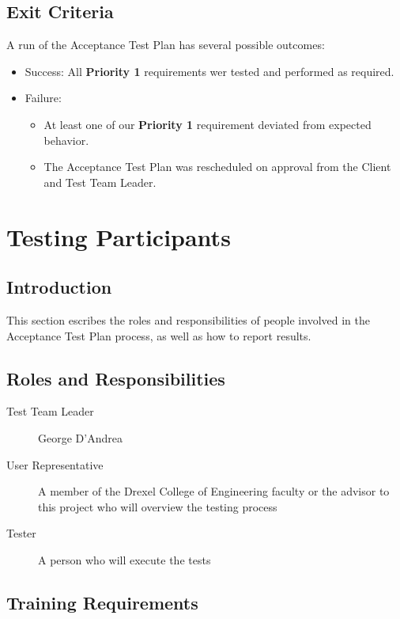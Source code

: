 \documentclass{article}
\begin{document}
\subsection{Exit Criteria}
	A run of the Acceptance Test Plan has several possible outcomes:
	\begin{itemize}
		\item Success: All \textbf{Priority 1} requirements wer tested and 
		performed as required.
		\item Failure:
			\begin{itemize}
				\item At least one of our \textbf{Priority 1} requirement 
				deviated from expected behavior.
				\item The Acceptance Test Plan was rescheduled on approval from 
				the Client and Test Team Leader.
			\end{itemize}
		
	\end{itemize}
	

\section{Testing Participants} %

\subsection{Introduction}

This section escribes the roles and responsibilities of people involved in the
Acceptance Test Plan process, as well as how to report results.

\subsection{Roles and Responsibilities}

\begin{description}
\item[Test Team Leader] George D'Andrea
\item[User Representative] A member of the Drexel College of Engineering
faculty or the advisor to this project who will overview the testing process
\item[Tester] A person who will execute the tests
\end{description}

\subsection{Training Requirements}
\end{document}
